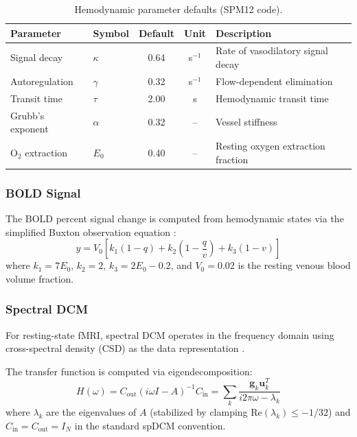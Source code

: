 \begin{table}[h]
  \centering
  \caption{Hemodynamic parameter defaults (SPM12 code).}
  \label{tab:hemo-params}
  \begin{tabular}{llccl}
    \toprule
    Parameter & Symbol & Default & Unit & Description \\
    \midrule
    Signal decay       & $\kappa$ & 0.64 & s$^{-1}$ & Rate of vasodilatory signal decay \\
    Autoregulation     & $\gamma$ & 0.32 & s$^{-1}$ & Flow-dependent elimination \\
    Transit time       & $\tau$   & 2.00 & s        & Hemodynamic transit time \\
    Grubb's exponent   & $\alpha$ & 0.32 & --       & Vessel stiffness \\
    O$_2$ extraction   & $E_0$    & 0.40 & --       & Resting oxygen extraction fraction \\
    \bottomrule
  \end{tabular}
\end{table}

\subsubsection{BOLD Signal}

The BOLD percent signal change is computed from hemodynamic states via
the simplified Buxton observation equation \citep{stephan2007}:
\begin{equation}
  y = V_0 \left[ k_1 (1 - q) + k_2 \left(1 - \frac{q}{v}\right) + k_3 (1 - v) \right]
  \label{eq:bold}
\end{equation}
where $k_1 = 7 E_0$, $k_2 = 2$, $k_3 = 2 E_0 - 0.2$, and
$V_0 = 0.02$ is the resting venous blood volume fraction.

\subsubsection{Spectral DCM}

For resting-state fMRI, spectral DCM operates in the frequency domain
using cross-spectral density (CSD) as the data representation
\citep{friston2014}.

The transfer function is computed via eigendecomposition:
\begin{equation}
  H(\omega) = C_\text{out} (i\omega I - A)^{-1} C_\text{in}
    = \sum_k \frac{\mathbf{g}_k \mathbf{u}_k^T}{i 2\pi\omega - \lambda_k}
  \label{eq:transfer}
\end{equation}
where $\lambda_k$ are the eigenvalues of $A$ (stabilized by clamping
$\text{Re}(\lambda_k) \leq -1/32$) and $C_\text{in} = C_\text{out} = I_N$
in the standard spDCM convention.


